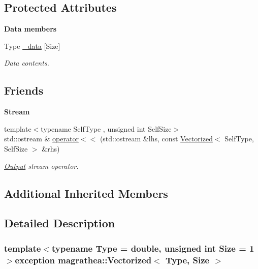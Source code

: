 \subsection*{Protected Attributes}
\begin{Indent}{\bf Data members}\par
\begin{DoxyCompactItemize}
\item 
Type \hyperlink{exceptionmagrathea_1_1Vectorized_a807e70ab36b29bab3d7985120a741254}{\-\_\-data} \mbox{[}Size\mbox{]}
\begin{DoxyCompactList}\small\item\em Data contents. \end{DoxyCompactList}\end{DoxyCompactItemize}
\end{Indent}
\subsection*{Friends}
\begin{Indent}{\bf Stream}\par
\begin{DoxyCompactItemize}
\item 
{\footnotesize template$<$typename Self\-Type , unsigned int Self\-Size$>$ }\\std\-::ostream \& \hyperlink{exceptionmagrathea_1_1Vectorized_a9028ffadf06611be8f9ed7ce9bb6b0c3}{operator$<$$<$} (std\-::ostream \&lhs, const \hyperlink{exceptionmagrathea_1_1Vectorized}{Vectorized}$<$ Self\-Type, Self\-Size $>$ \&rhs)
\begin{DoxyCompactList}\small\item\em \hyperlink{exceptionOutput}{Output} stream operator. \end{DoxyCompactList}\end{DoxyCompactItemize}
\end{Indent}
\subsection*{Additional Inherited Members}


\subsection{Detailed Description}
\subsubsection*{template$<$typename Type = double, unsigned int Size = 1$>$exception magrathea\-::\-Vectorized$<$ Type, Size $>$}

